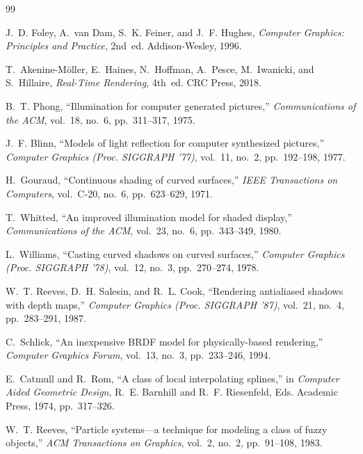 \documentclass[11pt,a4paper]{report}
\begin{document}
\begin{thebibliography}{99}

 J.~D. Foley, A.~van Dam, S.~K. Feiner, and J.~F. Hughes,
\emph{Computer Graphics: Principles and Practice}, 2nd~ed. Addison-Wesley, 1996.

 T.~Akenine-M\"oller, E.~Haines, N.~Hoffman, A.~Pesce, M.~Iwanicki, and
S.~Hillaire, \emph{Real-Time Rendering}, 4th~ed. CRC Press, 2018.

 B.~T. Phong, ``Illumination for computer generated pictures,''
\emph{Communications of the ACM}, vol.~18, no.~6, pp.~311--317, 1975.

 J.~F. Blinn, ``Models of light reflection for computer synthesized
pictures,'' \emph{Computer Graphics (Proc. SIGGRAPH '77)}, vol.~11, no.~2,
pp.~192--198, 1977.

 H.~Gouraud, ``Continuous shading of curved surfaces,'' \emph{IEEE
Transactions on Computers}, vol.~C-20, no.~6, pp.~623--629, 1971.

 T.~Whitted, ``An improved illumination model for shaded display,''
\emph{Communications of the ACM}, vol.~23, no.~6, pp.~343--349, 1980.

 L.~Williams, ``Casting curved shadows on curved surfaces,''
\emph{Computer Graphics (Proc. SIGGRAPH '78)}, vol.~12, no.~3, pp.~270--274, 1978.

 W.~T. Reeves, D.~H. Salesin, and R.~L. Cook, ``Rendering antialiased
shadows with depth maps,'' \emph{Computer Graphics (Proc. SIGGRAPH '87)}, vol.~21,
no.~4, pp.~283--291, 1987.

 C.~Schlick, ``An inexpensive BRDF model for physically-based
rendering,'' \emph{Computer Graphics Forum}, vol.~13, no.~3, pp.~233--246, 1994.

 E.~Catmull and R.~Rom, ``A class of local interpolating splines,'' in
\emph{Computer Aided Geometric Design}, R.~E. Barnhill and R.~F. Riesenfeld, Eds.
Academic Press, 1974, pp.~317--326.

 W.~T. Reeves, ``Particle systems---a technique for modeling a class
of fuzzy objects,'' \emph{ACM Transactions on Graphics}, vol.~2, no.~2, pp.~91--108,
1983.


\end{thebibliography}
\end{document}
